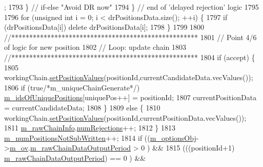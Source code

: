 \begin{DoxyCode}
      ;
1793       \} \textcolor{comment}{// if-else "Avoid DR now"}
1794     \} \textcolor{comment}{// end of 'delayed rejection' logic}
1795 
1796     \textcolor{keywordflow}{for} (\textcolor{keywordtype}{unsigned} \textcolor{keywordtype}{int} i = 0; i < drPositionsData.size(); ++i) \{
1797       \textcolor{keywordflow}{if} (drPositionsData[i]) \textcolor{keyword}{delete} drPositionsData[i];
1798     \}
1799 
1800     \textcolor{comment}{//****************************************************}
1801     \textcolor{comment}{// Point 4/6 of logic for new position}
1802     \textcolor{comment}{// Loop: update chain}
1803     \textcolor{comment}{//****************************************************}
1804     \textcolor{keywordflow}{if} (accept) \{
1805       workingChain.\hyperlink{class_q_u_e_s_o_1_1_base_vector_sequence_a5bcce98b68e0e24c05136e7a3bb50c12}{setPositionValues}(positionId,currentCandidateData.vecValues());
1806       \textcolor{keywordflow}{if} (\textcolor{keyword}{true}\textcolor{comment}{/*m\_uniqueChainGenerate*/}) \hyperlink{class_q_u_e_s_o_1_1_metropolis_hastings_s_g_ad1916a22b4a53ba67fa87f93c6e0a252}{m\_idsOfUniquePositions}[uniquePos++] = 
      positionId;
1807       currentPositionData = currentCandidateData;
1808     \}
1809     \textcolor{keywordflow}{else} \{
1810       workingChain.\hyperlink{class_q_u_e_s_o_1_1_base_vector_sequence_a5bcce98b68e0e24c05136e7a3bb50c12}{setPositionValues}(positionId,currentPositionData.vecValues());
1811       \hyperlink{class_q_u_e_s_o_1_1_metropolis_hastings_s_g_ac531509489028853bb17c0353fc9eafd}{m\_rawChainInfo}.\hyperlink{struct_q_u_e_s_o_1_1_m_h_raw_chain_info_struct_a276f608de19910713df01124a971c79c}{numRejections}++;
1812     \}
1813     \hyperlink{class_q_u_e_s_o_1_1_metropolis_hastings_s_g_a60695940f442f6568d10ee9e456032c7}{m\_numPositionsNotSubWritten}++;
1814     \textcolor{keywordflow}{if} ((\hyperlink{class_q_u_e_s_o_1_1_metropolis_hastings_s_g_a5d0bc9f73d50d272aa6bfb5ef5939ef3}{m\_optionsObj}->\hyperlink{class_q_u_e_s_o_1_1_metropolis_hastings_s_g_options_a9d4792d9fc2dc5439b8ab489b0c236eb}{m\_ov}.\hyperlink{class_q_u_e_s_o_1_1_mh_options_values_ad838a3095d5158e27b9af55597822d31}{m\_rawChainDataOutputPeriod}           
               >  0  ) &&
1815         (((positionId+1) %
      \hyperlink{class_q_u_e_s_o_1_1_mh_options_values_ad838a3095d5158e27b9af55597822d31}{m\_rawChainDataOutputPeriod}) == 0  ) &&

\end{DoxyCode}
